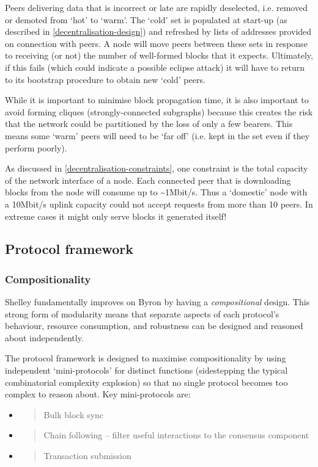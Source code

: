 \documentclass[11pt,a4paper]{article}
\begin{document}
Peers delivering data that is incorrect or late are rapidly deselected,
i.e. removed or demoted from `hot' to `warm'. The `cold' set is
populated at start-up (as described in
\cref{decentralisation-design}) and refreshed by
lists of addresses provided on connection with peers. A node will move
peers between these sets in response to receiving (or not) the number of
well-formed blocks that it expects. Ultimately, if this fails (which
could indicate a possible eclipse attack) it will have to return to its
bootstrap procedure to obtain new `cold' peers.

While it is important to minimise block propagation time, it is also
important to avoid forming cliques (strongly-connected subgraphs)
because this creates the risk that the network could be partitioned by
the loss of only a few bearers. This means some `warm' peers will need
to be `far off' (i.e. kept in the set even if they perform poorly).

As discussed in
\cref{decentralisation-constraints}, one constraint
is the total capacity of the network interface of a node. Each connected
peer that is downloading blocks from the node will consume up to
\textasciitilde{}1Mbit/s. Thus a `domestic' node with a 10Mbit/s uplink
capacity could not accept requests from more than 10 peers. In extreme
cases it might only serve blocks it generated itself!

\subsection{Protocol framework}
\label{protocol-framework}

\subsubsection{Compositionality}
\label{compositionality}

Shelley fundamentally improves on Byron by having a \emph{compositional}
design. This strong form of modularity means that separate aspects of
each protocol's behaviour, resource consumption, and robustness can be
designed and reasoned about independently.

The protocol framework is designed to maximise compositionality by using
independent `mini-protocols' for distinct functions (sidestepping the
typical combinatorial complexity explosion) so that no single protocol
becomes too complex to reason about. Key mini-protocols are:

\begin{itemize}
\item
  \begin{quote}
  Bulk block sync
  \end{quote}
\item
  \begin{quote}
  Chain following -- filter useful interactions to the consensus
  component
  \end{quote}
\item
  \begin{quote}
  Transaction submission
  \end{quote}
\end{itemize}
\end{document}
